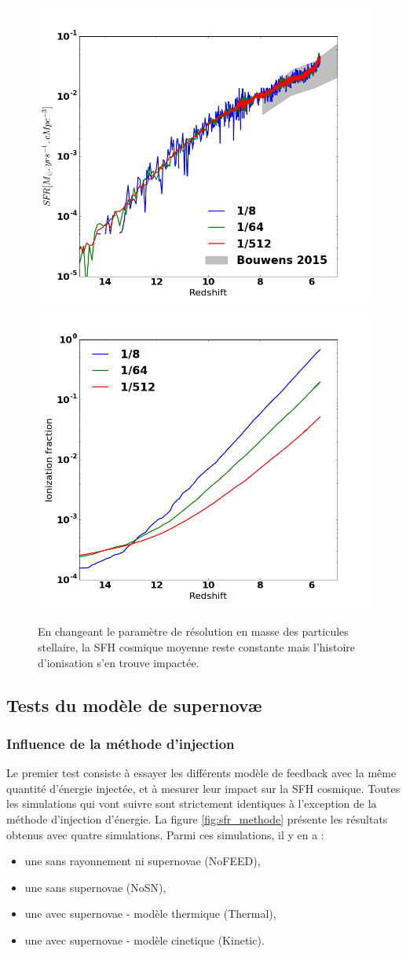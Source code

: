 \begin{figure}
        \includegraphics[width=.5\textwidth]{img/02/Mstar_SFH.png} 
        \includegraphics[width=.5\textwidth]{img/02/Mstar_xion.png} 
        \caption[Masse des étoiles]{En changeant le paramètre de résolution en masse des particules stellaire, la \ac{SFH} cosmique moyenne reste constante mais l'histoire d'ionisation s'en trouve impactée.
 		\label{fig:mstar}}
\end{figure}

\clearpage
\subsection{Tests du modèle de supernovæ}


\subsubsection{Influence de la méthode d'injection}
\label{sec:snmethod}

Le premier test consiste à essayer les différents modèle de feedback avec la même quantité d'énergie injectée, et à mesurer leur impact sur la \ac{SFH} cosmique.
Toutes les simulations qui vont suivre sont strictement identiques à l'exception de la méthode d'injection d'énergie.
La figure \ref{fig:sfr_methode} présente les résultats obtenus avec quatre simulations.
Parmi ces simulations, il y en a :
\begin{itemize}
\item une sans rayonnement ni supernovae (NoFEED),
\item une sans supernovae (NoSN),
\item une avec supernovae - modèle thermique (Thermal),
\item une avec supernovae - modèle cinetique (Kinetic).
\end{itemize}

